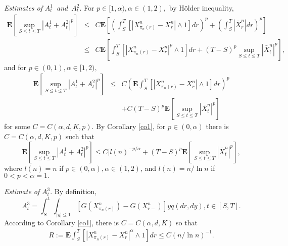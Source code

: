 \documentclass[11pt]{amsart}
\theoremstyle{plain}
\numberwithin{equation}{section}
\begin{document}
\emph{Estimates of }$A_t^{1}$\emph{\ and}{\footnotesize \ }$A_t^{2}$. For $p\in \lbrack 1,\alpha ),\alpha \in \left( 1,2\right) ,$ by H\"{o}lder
inequality, 
\begin{eqnarray*}
\mathbf{E}\left[ \sup_{S\leq t\leq T}\left\vert
A_{t}^{1}+A_{t}^{2}\right\vert ^{p}\right] &\leq &C\mathbf{E}\left[ \left(
\int_{S}^{T}[\left\vert X_{\pi _{n}\left( r\right)
}^{n}-X_{r}^{n}\right\vert \wedge 1]dr\right) ^{p}+\left(
\int_{S}^{T}\left\vert \bar{X}_{r}^{n}\right\vert dr\right) ^{p}\right] \\
&\leq &C\mathbf{E}\left[ \int_{S}^{T}[\left\vert X_{\pi _{n}\left( r\right)
}^{n}-X_{r}^{n}\right\vert ^{p}\wedge 1]dr+\left( T-S\right) ^{p}\sup_{S\leq
t\leq T}\left\vert \bar{X}_{t}^{n}\right\vert ^{p}\right] ,
\end{eqnarray*}and for $p\in \left( 0,1\right) ,\alpha \in \lbrack 1,2),$ 
\begin{eqnarray*}
\mathbf{E}\left[ \sup_{S\leq t\leq T}\left\vert
A_{t}^{1}+A_{t}^{2}\right\vert ^{p}\right] &\leq &C\left( \mathbf{E}\int_{S}^{T}[\left\vert X_{\pi _{n}\left( r\right)
}^{n}-X_{r}^{n}\right\vert \wedge 1]dr\right) ^{p} \\
&&+C(T-S)^{p}\mathbf{E}\left[ \sup_{S\leq t\leq T}\left\vert \bar{X}_{t}^{n}\right\vert ^{p}\right]
\end{eqnarray*}for some $C=C\left(\alpha,d, K,p\right) $. By Corollary \ref{co1}, for $p\in
\left( 0,\alpha \right) $ there is $C=C\left(\alpha,d, K,p\right) $ such that\begin{equation*}
\mathbf{E}\left[ \sup_{S\leq t\leq T}\left\vert
A_{t}^{1}+A_{t}^{2}\right\vert ^{p}\right] \leq C [l\left( n\right)
^{-p/\alpha }+\left( T-S\right) ^{p}\mathbf{E}[\sup_{S\leq t\leq
T}\left\vert \bar{X}_{t}^{n}\right\vert ^{p}],
\end{equation*}where $l\left( n\right) =n$ if $p\in (0,\alpha ),\alpha \in \left(
1,2\right) $, and $l\left( n\right) =n/\ln n$ if $0<p<\alpha =1.$

\emph{Estimate of }$A_t^{3}.$ By definition, 
\begin{equation*}
A_{t}^{3}=\int_{S}^{t}\int_{\left\vert y\right\vert \leq 1}\left[ G\left(
X_{\pi _{n}\left( r\right) }^{n}\right) -G\left( X_{r-}^{n}\right) \right]
yq\left( dr,dy\right) ,t\in \left[ S,T\right] .
\end{equation*}According to Corollary \ref{co1}, there is $C=C\left( \alpha,d ,K\right) $
so that 
\begin{eqnarray*}
R :=\mathbf{E}\int_{S}^{T}[\left\vert X_{\pi _{n}\left( r\right)
}^{n}-X_{r}^{n}\right\vert ^{\alpha }\wedge 1]dr\leq C\left( n/\ln n\right)
^{-1}.
\end{eqnarray*}
\end{document}
